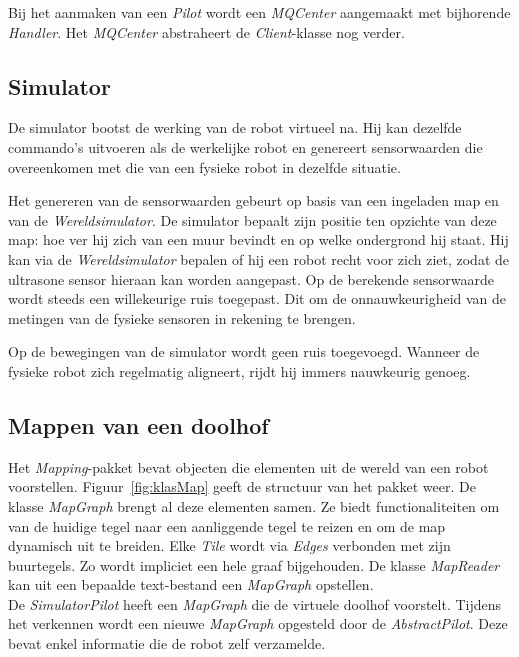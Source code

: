 \documentclass[eind]{penoverslag}
\begin{document}
Bij het aanmaken van een \textit{Pilot} wordt een \textit{MQCenter} aangemaakt met bijhorende \textit{Handler}. Het \textit{MQCenter} abstraheert de \textit{Client}-klasse nog verder.



\subsection{Simulator} 
\label{ssec:Sim}
De simulator bootst de werking van de robot virtueel na. Hij kan dezelfde commando's uitvoeren als de werkelijke robot en genereert sensorwaarden die overeenkomen met die van een fysieke robot in dezelfde situatie.

Het genereren van de sensorwaarden gebeurt op basis van een ingeladen map en van de \textit{Wereldsimulator}. De simulator bepaalt zijn positie ten opzichte van deze map: hoe ver hij zich van een muur bevindt en op welke ondergrond hij staat. Hij kan via de \textit{Wereldsimulator} bepalen of hij een robot recht voor zich ziet, zodat de ultrasone sensor hieraan kan worden aangepast. Op de berekende sensorwaarde wordt steeds een willekeurige ruis toegepast. Dit om de onnauwkeurigheid van de metingen van de fysieke sensoren in rekening te brengen.

Op de bewegingen van de simulator wordt geen ruis toegevoegd. Wanneer de fysieke robot zich regelmatig aligneert, rijdt hij immers nauwkeurig genoeg.

\subsection{Mappen van een doolhof}
\label{ssec:Mapping}
Het \textit{Mapping}-pakket bevat objecten die elementen uit de wereld van een robot voorstellen. Figuur~\ref{fig:klasMap} geeft de structuur van het pakket weer. De klasse \textit{MapGraph} brengt al deze elementen samen. Ze biedt functionaliteiten om van de huidige tegel naar een aanliggende tegel te reizen en om de map dynamisch uit te breiden. Elke \textit{Tile} wordt via \textit{Edges} verbonden met zijn buurtegels. Zo wordt impliciet een hele graaf bijgehouden. De klasse \textit{MapReader} kan uit een bepaalde text-bestand een \textit{MapGraph} opstellen.\\

De \textit{SimulatorPilot} heeft een \textit{MapGraph} die de virtuele doolhof voorstelt. Tijdens het verkennen wordt een nieuwe \textit{MapGraph} opgesteld door de \textit{AbstractPilot}. Deze bevat enkel informatie die de robot zelf verzamelde.
\end{document}
